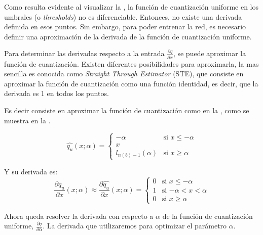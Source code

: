 Como resulta evidente al visualizar la , la función de cuantización uniforme en los umbrales (o \textit{thresholds}) no es diferenciable. Entonces, no existe una derivada definida en esos puntos. Sin embargo, para poder entrenar la red, es necesario definir una aproximación de la derivada de la función de cuantización uniforme.

Para determinar las derivadas respecto a la entrada $\frac{\partial q}{\partial x}$, se puede aproximar la función de cuantización. Existen diferentes posibilidades para aproximarla, la mas sencilla es conocida como \textit{Straight Through Estimator} (STE), que consiste en aproximar la función de cuantización como una función identidad, es decir, que la derivada es 1 en todos los puntos.

Es decir consiste en aproximar la función de cuantización como en la , como se muestra en la .

\begin{equation}
    \label{eq:uniform_quantizer_ste_signed}
    \hat{q_u}\left(x; \alpha\right) =
    \begin{cases}
        - \alpha & \text{si $x \leq -\alpha$} \\
        x \\
        l_{n\left(b\right) - 1}\left(\alpha\right) & \text{si $x \geq \alpha$}
    \end{cases}
\end{equation}


Y su derivada es: \\

\begin{equation}
    \label{eq:uniform_quantizer_ste_signed_derivative}
    \frac{\partial q_u}{\partial x}\left(x; \alpha\right) \approx
    \frac{\partial \hat{q_u}}{\partial x}\left(x; \alpha\right) =
    \begin{cases}
        0 & \text{si $x \leq -\alpha$} \\
        1 & \text{si $-\alpha < x < \alpha$} \\
        0 & \text{si $x \geq \alpha$}
    \end{cases}
\end{equation}

Ahora queda resolver la derivada con respecto a $\alpha$ de la función de cuantización uniforme, $\frac{\partial q}{\partial \alpha}$. La derivada que utilizaremos para optimizar el parámetro $\alpha$.


